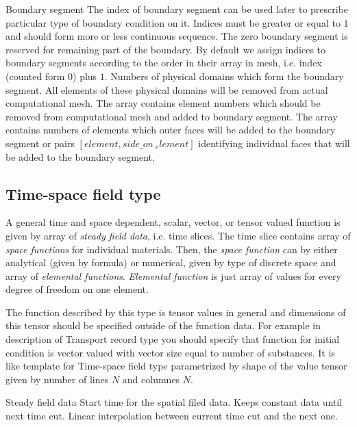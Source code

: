 \begin{recordtype}{Boundary segment}{}
 The index of boundary segment can be used later to prescribe particular type of boundary condition on it.
 Indices must be greater or equal to $1$ and should form more or less continuous sequence. The zero boundary segment is reserved for remaining part
 of the boundary. By default we assign indices to boundary segments according to the order in their array in mesh, i.e. index (counted form $0$) plus $1$.
 Numbers of physical domains which form the boundary segment. All elements of these physical domains will be removed from actual computational mesh.
 The array contains element numbers which should be removed from computational mesh and added to boundary segment.
 The array contains numbers of elements which outer faces will be added to the boundary segment or pairs $[element, side\_on\   _element]$ 
 identifying individual faces that will be added to the boundary segment.
\end{recordtype}

\subsection{Time-space field type}
A general time and space dependent, scalar, vector, or  tensor valued function is given by array
of {\it steady field data}, i.e. time slices. The time slice contains array of {\it space functions}
for individual materials. Then, the {\it space function} can by either analytical (given by formula)
or numerical, given by type of discrete space and array of {\it elemental functions}. {\it Elemental function} is
just array of values for every degree of freedom on one element.

The function described by this type is tensor values in general and dimensions of this tensor should be 
specified outside of the function data. For example in description of Transport record type you should specify that function
for initial condition is vector valued with vector size equal to number of substances. It is like template for Time-space field
type parametrized by shape of the value tensor given by number of lines $N$ and columnes $N$.


\begin{recordtype}{Steady field data}{}
  Start time for the spatial filed data. 
   Keeps constant data until next time cut.
   Linear interpolation between current time cut and the next one.
\end{recordtype}

